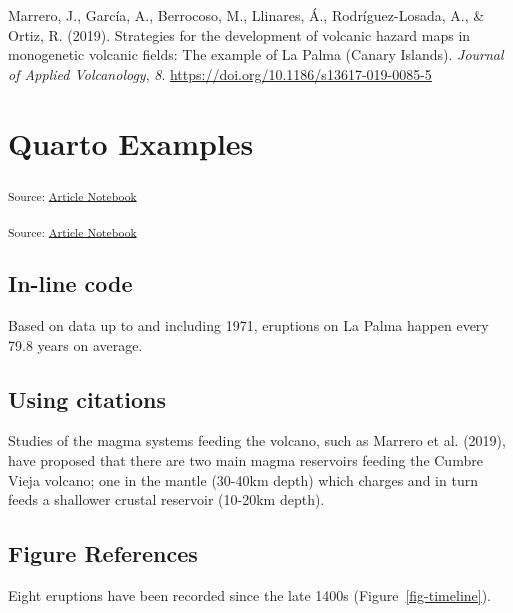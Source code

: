 \documentclass[
]{agujournal2019}
\newlength{\cslhangindent}
\newenvironment{CSLReferences}[2] %
 {\begin{list}{}{%
  \setlength{\itemindent}{0pt}
  \setlength{\leftmargin}{0pt}
  \setlength{\parsep}{0pt}
  \ifodd #1
   \setlength{\leftmargin}{\cslhangindent}
   \setlength{\itemindent}{-1\cslhangindent}
  \fi
  \setlength{\itemsep}{#2\baselineskip}}}
 {\end{list}}
\begin{document}
\protect{}\label{refs}
\begin{CSLReferences}{1}{0}
\vspace{1em}

Marrero, J., García, A., Berrocoso, M., Llinares, Á., Rodríguez-Losada,
A., \& Ortiz, R. (2019). Strategies for the development of volcanic
hazard maps in monogenetic volcanic fields: The example of {La} {Palma}
({Canary} {Islands}). \emph{Journal of Applied Volcanology}, \emph{8}.
\url{https://doi.org/10.1186/s13617-019-0085-5}

\end{CSLReferences}

\section{Quarto Examples}\label{sec-examples}

\textsubscript{Source:
\href{https://KamrynMansfield.github.io/bus_stop_amenities_safety/index.qmd.html}{Article
Notebook}}

\textsubscript{Source:
\href{https://KamrynMansfield.github.io/bus_stop_amenities_safety/index.qmd.html}{Article
Notebook}}

\subsection{In-line code}\label{in-line-code}

Based on data up to and including 1971, eruptions on La Palma happen
every 79.8 years on average.

\subsection{Using citations}\label{using-citations}

Studies of the magma systems feeding the volcano, such as Marrero et al.
(2019), have proposed that there are two main magma reservoirs feeding
the Cumbre Vieja volcano; one in the mantle (30-40km depth) which
charges and in turn feeds a shallower crustal reservoir (10-20km depth).

\subsection{Figure References}\label{figure-references}

Eight eruptions have been recorded since the late 1400s
(Figure~\ref{fig-timeline}).
\end{document}
